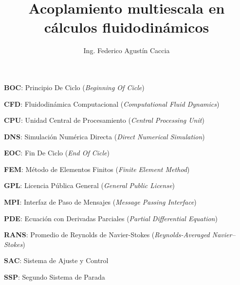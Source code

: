 \documentclass[12pt,screen,twoside,pagebackref]{ibtesis}
\title{Acoplamiento multiescala en cálculos fluidodinámicos}
\author{Ing. Federico Agustín Caccia}
\begin{document}
\renewcommand{\tablename}{Tabla} %


\begin{preliminary}



\begin{abreviaturas} %

\textbf{BOC}: Principio De Ciclo (\textit{Beginning Of Cicle})

\textbf{CFD}: Fluidodinámica Computacional (\textit{Computational Fluid Dynamics})

\textbf{CPU}: Unidad Central de Procesamiento (\textit{Central Processing Unit})

\textbf{DNS}: Simulación Numérica Directa (\textit{Direct Numerical Simulation})

\textbf{EOC}: Fin De Ciclo (\textit{End Of Cicle})

\textbf{FEM}: Método de Elementos Finitos (\textit{Finite Element Method})

\textbf{GPL}: Licencia Pública General (\textit{General Public License})



\textbf{MPI}: Interfaz de Paso de Mensajes (\textit{Message Passing Interface})

\textbf{PDE}: Ecuación con Derivadas Parciales (\textit{Partial Differential Equation})

\textbf{RANS}: Promedio de Reynolds de Navier-Stokes (\textit{Reynolds-Averaged Navier–Stokes})

\textbf{SAC}: Sistema de Ajuste y Control



\textbf{SSP}: Segundo Sistema de Parada

\end{abreviaturas}

\tableofcontents                %

\listoffigures                  %

\listoftables                   %



\end{preliminary}
\end{document}
